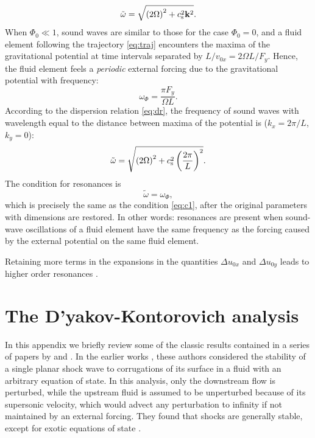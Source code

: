 \documentclass[useAMS,usenatbib]{mn2e}
\begin{document}
\begin{equation}
 \tilde{\omega} = \sqrt{ \left( 2 \Omega \right)^2 + c_{\rm s}^2 \mathbf{k}^2}.
\end{equation} 
When $\Phi_0\ll1$, sound waves are similar to those for the case $\Phi_0=0$, and a fluid element following the trajectory \eqref{eq:traj} encounters the maxima of the gravitational potential at time intervals separated by $L/v_{0x} = {2 \Omega L}/{F_y} $. Hence, the fluid element feels a \emph{periodic} external forcing due to the gravitational potential with frequency:
\begin{equation}
\omega_\Phi = \frac{\pi F_y}{ \Omega L}.
\end{equation} 
According to the dispersion relation \eqref{eq:dr}, the frequency of sound waves with wavelength equal to the distance between maxima of the potential is ($k_x=2 \pi / L$, $k_y = 0$):
\begin{equation}
 \tilde{\omega} = \sqrt{ \left( 2 \Omega \right)^2 + c_{\rm s}^2 \left( \frac{2 \pi}{L}\right) ^2}.
\end{equation} 
The condition for resonances is
\begin{equation}
 \tilde{\omega} = \omega_\Phi,
 \end{equation}
which is precisely the same as the condition \eqref{eq:c1}, after the original parameters with dimensions are restored. In other words: resonances are present when sound-wave oscillations of a fluid element have the same frequency as the forcing caused by the external potential on the same fluid element. 

Retaining more terms in the expansions in the quantities $\Delta u_{0x}$ and $\Delta u_{0y}$ leads to higher order resonances \citep{Shu+1973}. 


\section{The D'yakov-Kontorovich analysis} \label{appendix:landau}
%
In this appendix we briefly review some of the classic results contained in a series of papers by \cite{Dyakov54,Dyakov58a,Dyakov58b} and \cite{Kontorovich58,Kontorovich58b}. In the earlier works \citep{Dyakov54,Kontorovich58}, these authors considered the stability of a single planar shock wave to corrugations of its surface in a fluid with an arbitrary equation of state. In this analysis, only the downstream flow is perturbed, while the upstream fluid is assumed to be unperturbed because of its supersonic velocity, which would advect any perturbation to infinity if not maintained by an external forcing. They found that shocks are generally stable, except for exotic equations of state \citep[see also the discussion in  of][]{landau}. 
\end{document}
